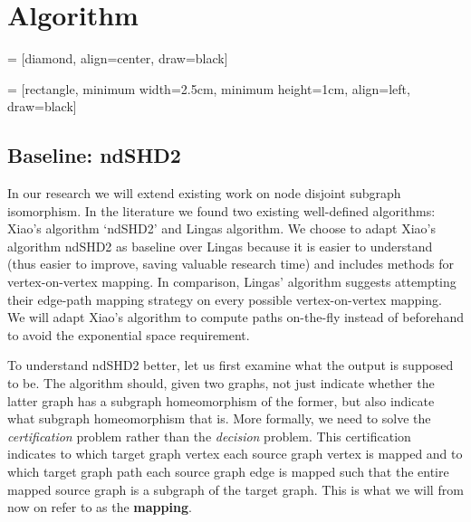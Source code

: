 \chapter{Algorithm}

 = [diamond, align=center, draw=black]

 = [rectangle, minimum width=2.5cm, minimum height=1cm, align=left, draw=black]


\section{Baseline: ndSHD2}
In our research we will extend existing work on node disjoint subgraph isomorphism. In the literature we found two existing well-defined algorithms: Xiao's algorithm `ndSHD2'\cite{XIAONODEDISJOINT} and Lingas algorithm\cite{LINGAS2009464}. We choose to adapt Xiao's algorithm ndSHD2 as baseline over Lingas because it is easier to understand (thus easier to improve, saving valuable research time) and includes methods for vertex-on-vertex mapping. In comparison, Lingas' algorithm suggests attempting their edge-path mapping strategy on every possible vertex-on-vertex mapping. We will adapt Xiao's algorithm to compute paths on-the-fly instead of beforehand to avoid the exponential space requirement.

To understand ndSHD2 better, let us first examine what the output is supposed to be. The algorithm should, given two graphs, not just indicate whether the latter graph has a subgraph homeomorphism of the former, but also indicate what subgraph homeomorphism that is. More formally, we need to solve the \textit{certification} problem rather than the \textit{decision} problem. This certification indicates to which target graph vertex each source graph vertex is mapped and to which target graph path each source graph edge is mapped such that the entire mapped source graph is a subgraph of the target graph. This is what we will from now on refer to as the \textbf{mapping}.

